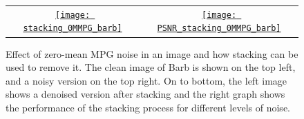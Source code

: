 \documentclass{article}
\begin{document}
\begin{figure}
{\begin{tabular}{cc}
      \href{https://nbviewer.org/github/vicente-gonzalez-ruiz/denoising/blob/main/figs/averaging_denoising.ipynb\#stacking_0MMPG_barb}{\texttt{[image: stacking\_0MMPG\_barb]}} & \href{https://nbviewer.org/github/vicente-gonzalez-ruiz/denoising/blob/main/figs/averaging_denoising.ipynb\#PSNR_stacking_0MMPG_barb}{\texttt{[image: PSNR\_stacking\_0MMPG\_barb]}}
    \end{tabular}
  }
  \caption{Effect of zero-mean MPG noise in an image and how stacking
    can be used to remove it. The clean image of Barb is shown on the
    top left, and a noisy version on the top right. On to bottom, the
    left image shows a denoised version after stacking and the right
    graph shows the performance of the stacking process for different
    levels of noise.\label{fig:stacking_0MMPG}}
\end{figure}
\end{document}
